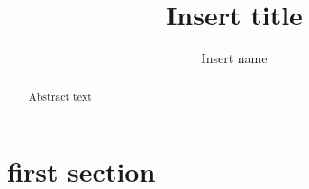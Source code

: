 \documentclass[]{article}
\title{Insert title}
\author{Insert name}
\date{}
\begin{document}
\maketitle

\begin{abstract}
	
	Abstract text

\end{abstract}

\section{first section} 

\printbibliography
\end{document}
